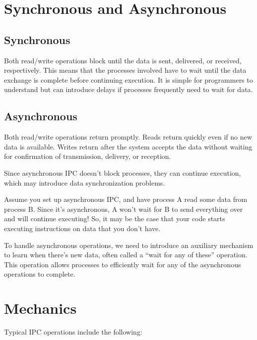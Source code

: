 \documentclass{report}
\newcommand{\exampleBegin}[1]{\begin{tcolorbox}[colback=blue!5!white,colframe=black!75!blue,title={Example:
      #1}]}
\newcommand{\exampleEnd}{\end{tcolorbox}}
\begin{document}
\section{Synchronous and Asynchronous}


\subsection{Synchronous}
Both read/write operations block until the data is sent, delivered, or received, respectively. This
means that the processes involved have to wait until the data exchange is complete before continuing
execution. It is simple for programmers to understand but can introduce delays if processes
frequently need to wait for data.


\subsection{Asynchronous}
Both read/write operations return promptly. Reads return quickly even if no new data is
available. Writes return after the system accepts the data without waiting for confirmation of
transmission, delivery, or reception.

Since asynchronous IPC doesn't block processes, they can continue execution, which may introduce
data synchronization problems.

\exampleBegin{404}
Assume you set up asynchronous IPC, and have process A read some data from process B. Since it's
asynchronous, A won't wait for B to send everything over and will continue executing! So, it may be
the case that your code starts executing instructions on data that you don't have.
\exampleEnd

To handle asynchronous operations, we need to introduce an auxiliary mechanism to learn when there's
new data, often called a ``wait for any of these'' operation. This operation allows processes to
efficiently wait for any of the asynchronous operations to complete.





\section{Mechanics}
Typical IPC operations include the following:
\end{document}
